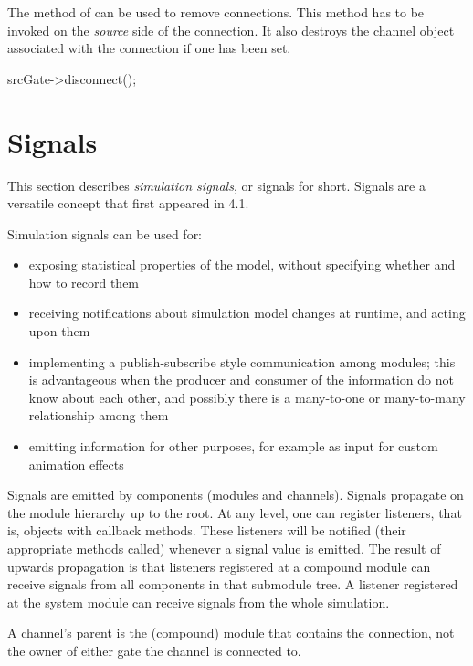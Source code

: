The  method of  can be
used to remove connections. This method has to be invoked
on the \textit{source} side of the connection. It also destroys
the channel object associated with the connection if one has been set.

\begin{cpp}
srcGate->disconnect();
\end{cpp}



\section{Signals}
\label{sec:simple-modules:signals}

This section describes \textit{simulation signals}, or signals for short.
Signals are a versatile concept that first appeared in {\opp} 4.1.

Simulation signals can be used for:

\begin{itemize}
  \item exposing statistical properties of the model, without specifying
        whether and how to record them
  \item receiving notifications about simulation model changes at runtime, and
        acting upon them
  \item implementing a publish-subscribe style communication among modules;
        this is advantageous when the producer and consumer of the information
        do not know about each other, and possibly there is a many-to-one or
        many-to-many relationship among them
  \item emitting information for other purposes, for example as input for
        custom animation effects
\end{itemize}

Signals are emitted by components (modules and channels). Signals propagate on
the module hierarchy up to the root. At any level, one can register listeners,
that is, objects with callback methods. These listeners will be notified (their
appropriate methods called) whenever a signal value is emitted. The result of
upwards propagation is that listeners registered at a compound module can
receive signals from all components in that submodule tree. A listener
registered at the system module can receive signals from the whole simulation.

\begin{note}
    A channel's parent is the (compound) module that contains the connection,
    not the owner of either gate the channel is connected to.
\end{note}

